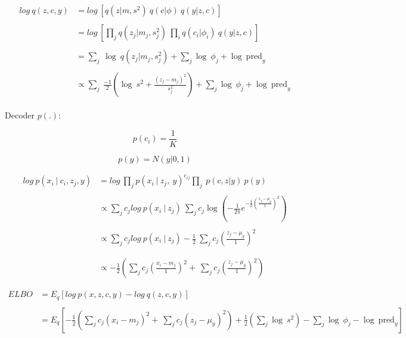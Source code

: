 \documentclass[12pt]{article}
\begin{document}
\begin{align}
  \begin{split}
log~ q(z,c,y) &= log~[q(z|m, s^2)~q(c| \phi)~q(y|z,c)] \\\\
 &= log~\left[ \prod_j q(z_{j}| m_j, s_j^2)~\prod_i q(c_i| \phi_i)~q(y| z,c) \right]\\\\
&= \sum_{j}~\log~q(z_{j}| m_j, s_j^2) +  \sum_{j} \log~ \phi_{j} + \log~ \text{pred}_{y} \\ \\
&\propto \sum_{j}~ \frac{-1}{2}\left( \log~s^2 + \frac{(z_{j}-m_{j})^2}{s_{j}^2} \right)+\sum_{j} \log~ \phi_{j} + \log~ \text{pred}_{y}
  \end{split}
\end{align}

Decoder $p(.)$:


$$p(c_i) = \dfrac{1}{K}$$

$$p(y) = N(y|0,1)$$

\begin{align*}
log~p(x_i~\vert~c_i, z_{j},y) &= log~\prod_j p(x_i~\vert~z_j ,~y)^{c_{ij}} \prod_{j}~p(c,z|y) ~p(y)\\ \\
 &\propto \sum_j c_{j} log~p(x_i~\vert~z_j)~\sum_{j}c_{j}\log\left( -\frac{1}{2\pi}e^{-\frac{1}{2}\left( \frac{z_{j}-\mu_{y}}{1} \right)^2} \right) \\ \\
 &\propto \sum_j c_{j} log~p(x_i~\vert~z_j)  -\frac{1}{2}~\sum_{j}c_{j}\left( \frac{z_{j}-\mu_{y}}{1} \right)^2 \\ \\ \\
&\propto -\frac{1}{2}( \sum_j c_{j}\left( \frac{x_{i}-m_{j}}{1} \right)^2+~\sum_{j}c_{j}\left( \frac{z_{j}-\mu_{y}}{1} \right)^2)
\end{align*}


\begin{align*}
ELBO  &= E_q[log~p(x,z,c,y) - log~q(z,c,y)] \\ \\
&= E_{q}[-\frac{1}{2}( \sum_j c_{j}\left( x_{i}-m_{j} \right)^2+~\sum_{j}c_{j}\left( z_{j}-\mu_{y} \right)^2) + \frac{1}{2}\left(\sum_{j} \log~s^2  \right) - \sum_{j} \log~ \phi_{j} - \log~ \text{pred}_{y}] \\ \\
\end{align*}
\end{document}
